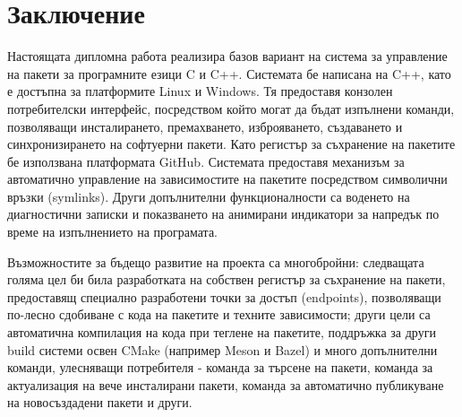 \chapter*{Заключение}

Настоящата дипломна работа реализира базов вариант на система за управление на
пакети за програмните езици C и C++. Системата бе написана на C++, като е
достъпна за платформите Linux и Windows. Тя предоставя конзолен потребителски
интерфейс, посредством който могат да бъдат изпълнени команди, позволяващи
инсталирането, премахването, изброяването, създаването и синхронизирането на
софтуерни пакети. Като регистър за съхранение на пакетите бе използвана
платформата GitHub. Системата предоставя механизъм за автоматично управление на
зависимостите на пакетите посредством символични връзки (symlinks). Други
допълнителни функционалности са воденето на диагностични записки и показването
на анимирани индикатори за напредък по време на изпълнението на програмата.

Възможностите за бъдещо развитие на проекта са многобройни: следващата голяма
цел би била разработката на собствен регистър за съхранение на пакети,
предоставящ специално разработени точки за достъп (endpoints), позволяващи
по-лесно сдобиване с кода на пакетите и техните зависимости; други цели са
автоматична компилация на кода при теглене на пакетите, поддръжка за други build
системи освен CMake (например Meson и Bazel) и много допълнителни команди,
улесняващи потребителя - команда за търсене на пакети, команда за актуализация
на вече инсталирани пакети, команда за автоматично публикуване на новосъздадени
пакети и други.
